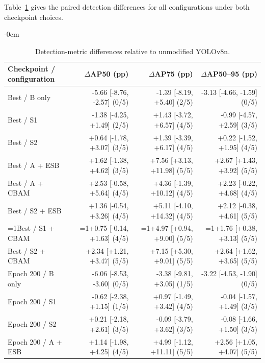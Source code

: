 \documentclass[energies,article,submit,pdftex,moreauthors]{Definitions/mdpi}
\providecommand{\revisionmode}{0}
\newcommand{\rev}[1]{\ifnum\revisionmode=1\relax{\color{red}#1}\else#1\fi}
\begin{document}
Table~\ref{tab:ap_ci_v12} gives the paired detection differences for all configurations under both checkpoint choices.
\begin{table}[H]
\begin{adjustwidth}{-\extralength}{0cm}
\caption{Detection-metric differences relative to unmodified YOLOv8n.}\label{tab:ap_ci_v12}
\centering\small\setlength{\tabcolsep}{4pt}
\begin{adjustbox}{max width=\fulllength}
\begin{tabular}{lrrr}
\toprule
\shortstack{Checkpoint /\\configuration} & \shortstack{$\Delta$AP50\\(pp)} & \shortstack{$\Delta$AP75\\(pp)} & \shortstack{$\Delta$AP50--95\\(pp)} \\
\midrule
Best / B only & -5.66 [-8.76, -2.57] (0/5) & -1.39 [-8.19, +5.40] (2/5) & -3.13 [-4.66, -1.59] (0/5) \\
Best / S1 & -1.38 [-4.25, +1.49] (2/5) & +1.43 [-3.72, +6.57] (4/5) & -0.99 [-4.57, +2.59] (3/5) \\
Best / S2 & +0.64 [-1.78, +3.07] (3/5) & +1.39 [-3.39, +6.17] (4/5) & +0.22 [-1.52, +1.95] (4/5) \\
Best / A + ESB & +1.62 [-1.38, +4.62] (3/5) & +7.56 [+3.13, +11.98] (5/5) & +2.67 [+1.43, +3.92] (5/5) \\
Best / A + CBAM & +2.53 [-0.58, +5.64] (4/5) & +4.36 [-1.39, +10.12] (4/5) & +2.23 [-0.22, +4.68] (4/5) \\
Best / S2 + ESB & +1.36 [-0.54, +3.26] (4/5) & +5.11 [-4.10, +14.32] (4/5) & +2.12 [-0.38, +4.61] (5/5) \\
\rev{Best / S1 + CBAM} & \rev{+0.75 [-0.14, +1.63] (4/5)} & \rev{+4.97 [+0.94, +9.00] (5/5)} & \rev{+1.76 [+0.38, +3.13] (5/5)} \\
Best / S2 + CBAM & +2.34 [+1.21, +3.47] (5/5) & +7.15 [+5.30, +9.01] (5/5) & +2.64 [+1.62, +3.65] (5/5) \\
Epoch 200 / B only & -6.06 [-8.53, -3.60] (0/5) & -3.38 [-9.81, +3.05] (1/5) & -3.22 [-4.53, -1.90] (0/5) \\
Epoch 200 / S1 & -0.62 [-2.38, +1.15] (1/5) & +0.97 [-1.49, +3.42] (4/5) & -0.04 [-1.57, +1.49] (3/5) \\
Epoch 200 / S2 & +0.21 [-2.18, +2.61] (3/5) & -0.09 [-3.79, +3.62] (3/5) & -0.08 [-1.66, +1.50] (3/5) \\
Epoch 200 / A + ESB & +1.14 [-1.98, +4.25] (4/5) & +4.99 [-1.12, +11.11] (5/5) & +2.56 [+1.05, +4.07] (5/5) \\

\end{tabular}
\end{adjustbox}
\end{adjustwidth}
\end{table}
\end{document}
